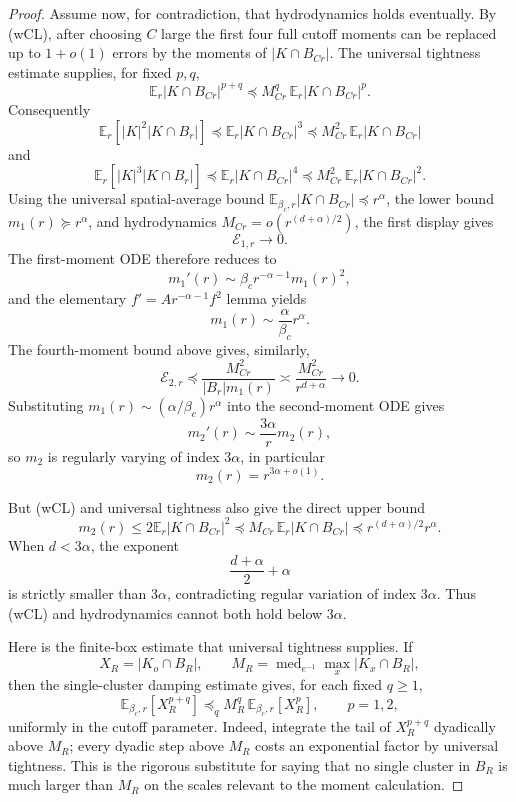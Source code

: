 \documentclass[11pt,reqno]{book}
\numberwithin{equation}{chapter}
\theoremstyle{plain}
\theoremstyle{definition}
\theoremstyle{remark}
\newcommand{\E}{\mathbb E}
\newcommand{\1}{\mathbf 1}
\newcommand{\pre}{\preceq}
\newcommand{\suc}{\succeq}
\begin{document}
\begin{proof}
Assume now, for contradiction, that hydrodynamics holds eventually. By
(wCL), after choosing \(C\) large the first four full cutoff moments can be
replaced up to \(1+o(1)\) errors by the moments of \(|K\cap B_{Cr}|\). The
universal tightness estimate supplies, for fixed \(p,q\),
\[
  \E_r|K\cap B_{Cr}|^{p+q}
  \pre
  M_{Cr}^q\,\E_r|K\cap B_{Cr}|^p.
\]
Consequently
\[
  \E_r[|K|^2|K\cap B_r|]
  \pre
  \E_r|K\cap B_{Cr}|^3
  \pre
  M_{Cr}^2\,\E_r|K\cap B_{Cr}|
\]
and
\[
  \E_r[|K|^3|K\cap B_r|]
  \pre
  \E_r|K\cap B_{Cr}|^4
  \pre
  M_{Cr}^2\,\E_r|K\cap B_{Cr}|^2.
\]
Using the universal spatial-average bound
\(\E_{\beta_c,r}|K\cap B_{Cr}|\pre r^\alpha\), the lower bound
\(m_1(r)\suc r^\alpha\), and hydrodynamics
\(M_{Cr}=o(r^{(d+\alpha)/2})\), the first display gives
\[
  \mathcal E_{1,r}\to0.
\]
The first-moment ODE therefore reduces to
\[
  m_1'(r)\sim \beta_c r^{-\alpha-1}m_1(r)^2,
\]
and the elementary \(f'=Ar^{-\alpha-1}f^2\) lemma yields
\[
  m_1(r)\sim \frac{\alpha}{\beta_c}r^\alpha.
\]
The fourth-moment bound above gives, similarly,
\[
  \mathcal E_{2,r}
  \pre
  \frac{M_{Cr}^2}{|B_r|m_1(r)}
  \asymp
  \frac{M_{Cr}^2}{r^{d+\alpha}}
  \longrightarrow0.
\]
Substituting \(m_1(r)\sim(\alpha/\beta_c)r^\alpha\) into the second-moment
ODE gives
\[
  m_2'(r)\sim \frac{3\alpha}{r}m_2(r),
\]
so \(m_2\) is regularly varying of index \(3\alpha\), in particular
\[
  m_2(r)=r^{3\alpha+o(1)}.
\]

But (wCL) and universal tightness also give the direct upper bound
\[
  m_2(r)
  \leq
  2\E_r|K\cap B_{Cr}|^2
  \pre
  M_{Cr}\,\E_r|K\cap B_{Cr}|
  \pre
  r^{(d+\alpha)/2}r^\alpha .
\]
When \(d<3\alpha\), the exponent
\[
  \frac{d+\alpha}{2}+\alpha
\]
is strictly smaller than \(3\alpha\), contradicting regular variation of
index \(3\alpha\). Thus (wCL) and hydrodynamics cannot both hold below
\(3\alpha\).

Here is the finite-box estimate that universal tightness supplies. If
\[
  X_R=|K_o\cap B_R|,
  \qquad
  M_R=\operatorname{med}_{e^{-1}}\max_x |K_x\cap B_R|,
\]
then the single-cluster damping estimate gives, for each fixed \(q\geq1\),
\[
  \E_{\beta_c,r}[X_R^{p+q}]
  \pre_q
  M_R^q\,\E_{\beta_c,r}[X_R^p],
  \qquad p=1,2,
\]
uniformly in the cutoff parameter. Indeed, integrate the tail of
\(X_R^{p+q}\) dyadically above \(M_R\); every dyadic step above \(M_R\) costs
an exponential factor by universal tightness. This is the rigorous substitute
for saying that no single cluster in \(B_R\) is much larger than \(M_R\) on
the scales relevant to the moment calculation.


\end{proof}
\end{document}
